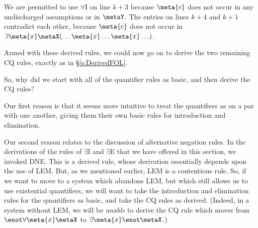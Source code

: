 \begin{fitchproof}
	\open
	\close
	\open
	\close
\end{fitchproof}\noindent
We are permitted to use $\forall$I on line $k+3$ because $\meta{c}$ does not occur in any  undischarged assumptions or in $\metaY$. The entries on lines $k+4$ and $k+1$ contradict each other, because $\meta{c}$ does not occur in $\exists \meta{x} \metaX(\ldots \meta{x} \ldots \meta{x} \ldots)$.

Armed with these derived rules, we could now go on to derive the two remaining CQ rules, exactly as in \S\ref{s:DerivedFOL}.

So, why did we start with all of the quantifier rules as basic, and then derive the CQ rules? 

Our first reason is that it seems more intuitive to treat the quantifiers as on a par with one another, giving them their own basic rules for introduction and elimination. 

Our second reason relates to the discussion of alternative negation rules. In the derivations of the rules of $\exists$I and $\exists$E that we have offered in this section, we invoked DNE. This is a derived rule, whose derivation essentially depends upon the use of LEM. But, as we mentioned earlier, LEM is a contentious rule. So, if we want to move to a system which abandons LEM, but which still allows us to use existential quantifiers, we will want to take the introduction and elimination rules for the quantifiers as basic, and take the CQ rules as derived. (Indeed, in a system without LEM, we will be \emph{unable} to derive the CQ rule which moves from $\enot \forall \meta{x} \metaX$ to $\exists \meta{x} \enot \metaX$.)
